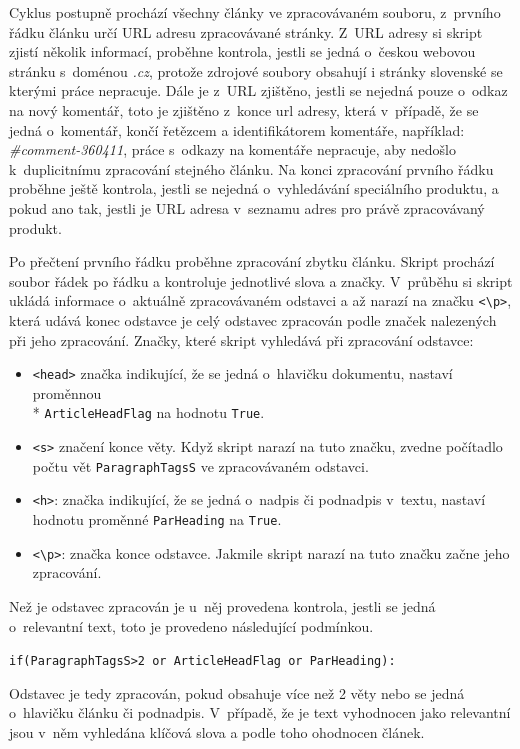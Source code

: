 Cyklus postupně prochází všechny články ve zpracovávaném souboru, z~prvního řádku článku určí URL adresu zpracovávané stránky. Z~URL adresy si skript zjistí několik informací, proběhne kontrola, jestli se jedná o~českou webovou stránku s~doménou \textit{.cz}, protože zdrojové soubory obsahují i stránky slovenské se kterými práce nepracuje. Dále je z~URL zjištěno, jestli se nejedná pouze o~odkaz na nový komentář, toto je zjištěno z~konce url adresy, která v~případě, že se jedná o~komentář, končí řetězcem a identifikátorem komentáře, například: \textit{\#comment-360411}, práce s~odkazy na komentáře nepracuje, aby nedošlo k~duplicitnímu zpracování stejného článku. Na konci zpracování prvního řádku proběhne ještě kontrola, jestli se nejedná o~vyhledávání speciálního produktu, a pokud ano tak, jestli je URL adresa v~seznamu adres pro právě zpracovávaný produkt.

Po přečtení prvního řádku proběhne zpracování zbytku článku. Skript prochází soubor řádek po řádku a kontroluje jednotlivé slova a značky. V~průběhu si skript ukládá informace o~aktuálně zpracovávaném odstavci a až narazí na značku \verb|<\p>|, která udává konec odstavce je celý odstavec zpracován podle značek nalezených při jeho zpracování. Značky, které skript vyhledává při zpracování odstavce:
\begin{itemize}
    \item \verb|<head>| značka indikující, že se jedná o~hlavičku dokumentu, nastaví proměnnou\\* \verb|ArticleHeadFlag| na hodnotu \verb|True|.
    \item \verb|<s>| značení konce věty. Když skript narazí na tuto značku, zvedne počítadlo počtu vět \verb|ParagraphTagsS| ve zpracovávaném odstavci.
    \item \verb|<h>|: značka indikující, že se jedná o~nadpis či podnadpis v~textu, nastaví hodnotu proměnné \verb|ParHeading| na \verb|True|.
    \item \verb|<\p>|: značka konce odstavce. Jakmile skript narazí na tuto značku začne jeho zpracování.  
\end{itemize}

Než je odstavec zpracován je u~něj provedena kontrola, jestli se jedná o~relevantní text, toto je provedeno následující podmínkou.
\begin{center}
    \verb|if(ParagraphTagsS>2 or ArticleHeadFlag or ParHeading):|
\end{center}

Odstavec je tedy zpracován, pokud obsahuje více než 2 věty nebo se jedná o~hlavičku článku či podnadpis. V~případě, že je text vyhodnocen jako relevantní jsou v~něm vyhledána klíčová slova a podle toho ohodnocen článek.

